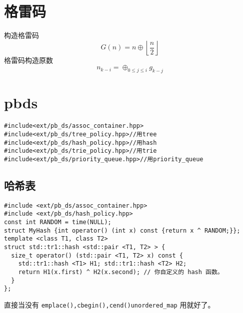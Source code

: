 \documentclass[a4paper]{report}
\begin{document}
\section{格雷码}
构造格雷码\\
$$
G(n)=n\oplus \left\lfloor\frac{n}{2}\right\rfloor
$$
格雷码构造原数\\
$$
n_{k-i}=\oplus_{0\le j \le i} g_{k-j}
$$

\section{pbds}
\begin{verbatim}  
#include<ext/pb_ds/assoc_container.hpp>
#include<ext/pb_ds/tree_policy.hpp>//用tree
#include<ext/pb_ds/hash_policy.hpp>//用hash
#include<ext/pb_ds/trie_policy.hpp>//用trie
#include<ext/pb_ds/priority_queue.hpp>//用priority_queue    
\end{verbatim}  

\subsection{哈希表}
\begin{verbatim}
#include <ext/pb_ds/assoc_container.hpp>
#include <ext/pb_ds/hash_policy.hpp>
const int RANDOM = time(NULL);
struct MyHash {int operator() (int x) const {return x ^ RANDOM;}};
template <class T1, class T2>
struct std::tr1::hash <std::pair <T1, T2> > {
  size_t operator() (std::pair <T1, T2> x) const {
    std::tr1::hash <T1> H1; std::tr1::hash <T2> H2;
    return H1(x.first) ^ H2(x.second); // 你自定义的 hash 函数。
  }
};
\end{verbatim}
直接当没有 \texttt{emplace(),cbegin(),cend()}\texttt{unordered\_map} 用就好了。\\
\end{document}
